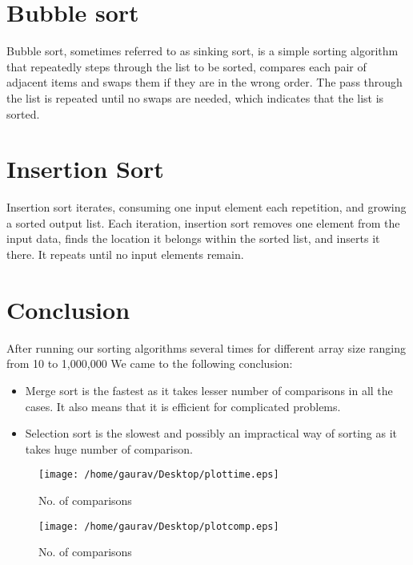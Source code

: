 \documentclass{IEEEtran}
\begin{document}
\section{Bubble sort}
\begin{flushleft}
Bubble sort, sometimes referred to as sinking sort, is a simple sorting algorithm that repeatedly steps through the list to be sorted, compares each pair of adjacent items and swaps them if they are in the wrong order. The pass through the list is repeated until no swaps are needed, which indicates that the list is sorted. 
\end{flushleft}

\section{Insertion Sort}
\begin{flushleft}
Insertion sort iterates, consuming one input element each repetition, and growing a sorted output list. Each iteration, insertion sort removes one element from the input data, finds the location it belongs within the sorted list, and inserts it there. It repeats until no input elements remain.\newline \newline \newline
\end{flushleft}

\section{Conclusion}
\begin{flushleft}
After running our sorting algorithms several times for different array size ranging from 10 to 1,000,000 \newline
We came to the following conclusion: \newline
\begin{itemize}
\item Merge sort is the fastest as it takes lesser number of comparisons in all the cases. It also means that it is efficient for complicated problems.
\item Selection sort is the slowest and possibly an impractical way of sorting as it takes huge number of comparison.
\end{itemize}
\end{flushleft}

\begin{figure}
\texttt{[image: /home/gaurav/Desktop/plottime.eps]}
\caption{No. of comparisons}
\end{figure}

\begin{figure}
\texttt{[image: /home/gaurav/Desktop/plotcomp.eps]}
\caption{No. of comparisons}
\end{figure}
\end{document}
